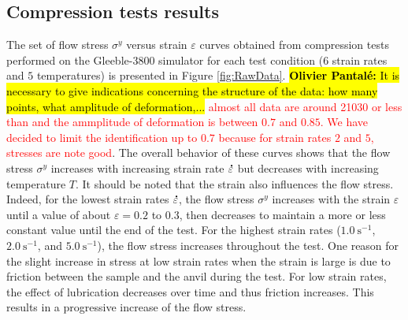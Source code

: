\documentclass[twoside,english,1p,final,sort&compress]{elsarticle}
\theoremstyle{plain}
\newcommand{\mdot}[1]{\accentset{\mbox{\bfseries .}}{#1}}
\newcommand{\ps}{\text{s}^{-1}}
\DeclareRobustCommand{\OP}[1]{ {\begingroup\sethlcolor{VWyellow}\textcolor{red}{\hl{\textbf{Olivier Pantal\'e:} #1}}\endgroup} }
\begin{document}
\subsection{Compression tests results\label{sec:ComTestResults}}

The set of flow stress $\sigma^y$ versus strain $\varepsilon$ curves obtained from compression tests performed on the Gleeble-3800 simulator for each test condition ($6$ strain rates and $5$ temperatures) is presented in Figure \ref{fig:RawData}.
\OP{It is necessary to give indications concerning the structure of the data: how many points, what amplitude of deformation,...}\textcolor{red}{almost all data are around 21030 or less than and the ammplitude of deformation is between $0.7$ and $0.85$.
We have decided to limit the identification up to $0.7$ because for strain rates $2$ and $5$, stresses are note good}.
The overall behavior of these curves shows that the flow stress $\sigma^y$ increases with increasing strain rate $\mdot\varepsilon$ but decreases with increasing temperature $T$.
It should be noted that the strain also influences the flow stress.
Indeed, for the lowest strain rates $\mdot\varepsilon$, the flow stress $\sigma^y$ increases with the strain $\varepsilon$ until a value of about $\varepsilon=0.2$ to $0.3$, then decreases to maintain a more or less constant value until the end of the test.
For the highest strain rates ($1.0~\ps$, $2.0~\ps$, and $5.0~\ps$), the flow stress increases throughout the test.
One reason for the slight increase in stress at low strain rates when the strain is large is due to friction between the sample and the anvil during the test.
For low strain rates, the effect of lubrication decreases over time and thus friction increases.
This results in a progressive increase of the flow stress.
\end{document}
